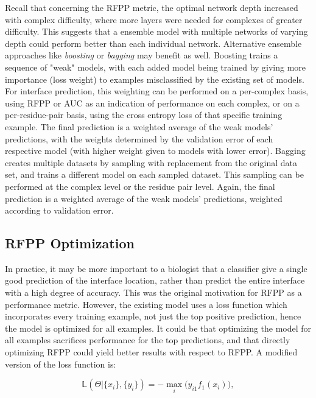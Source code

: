 Recall that concerning the RFPP metric, the optimal network depth increased with complex difficulty, where more layers were needed for complexes of greater difficulty. 
This suggests that a ensemble model with multiple networks of varying depth could perform  better than each individual network.
Alternative ensemble approaches like \emph{boosting} or \emph{bagging} may benefit as well.
Boosting trains a sequence of "weak" models, with each added model being trained by giving more importance (loss weight) to examples misclassified by the existing set of models.
For interface prediction, this weighting can be performed on a per-complex basis, using RFPP or AUC as an indication of performance on each complex, or on a per-residue-pair basis, using the cross entropy loss of that specific training example.
The final prediction is a weighted average of the weak models' predictions, with the weights determined by the validation error of each respective model (with higher weight given to models with lower error).
Bagging creates multiple datasets by sampling with replacement from the original data set, and trains a different model on each sampled dataset.
This sampling can be performed at the complex level or the residue pair level.
Again, the final prediction is a weighted average of the weak models' predictions, weighted according to validation error.



\subsection{RFPP Optimization}

In practice, it may be more important to a biologist that a classifier give a single good prediction of the interface location, rather than predict the entire interface with a high degree of accuracy.
This was the original motivation for RFPP as a performance metric.
However, the existing model uses a loss function which incorporates every training example, not just the top positive prediction, hence the model is optimized for all examples.
It could be that optimizing the model for all examples sacrifices performance for the top predictions, and that directly optimizing RFPP could yield better results with respect to RFPP.
A modified version of the loss function is:

\begin{equation}
\mathbb{L}(\Theta | \{x_i\}, \{y_i\}) = - \max_{i} \big(y_{i1} f_1(x_i)\big),
\label{eq:rfpp_optimize}
\end{equation}

